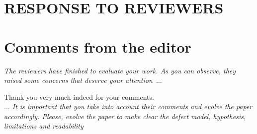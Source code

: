 \documentclass[twocolumn,5p]{elsarticle}
\newcommand{\review}[1]{\noindent\textit{#1\\}}
\theoremstyle{break}
\begin{document}
\pagebreak
\newpage
\appendix
\renewcommand*{\thesection}{\Alph{section}}
\nobalance
\section*{RESPONSE TO REVIEWERS}
\section*{Comments from the editor}
\review{The reviewers have finished to  evaluate your work. 
	As you 
	can observe, they raised some concerns that deserve your attention~$\ldots$}

\noindent Thank you very much indeed for your comments.\\


\review{ $\ldots$  It is important that you take into account their 
	comments and 
	evolve the paper accordingly. Please,  evolve the paper to make clear the 
	defect model, hypothesis, limitations and readability}
\end{document}
